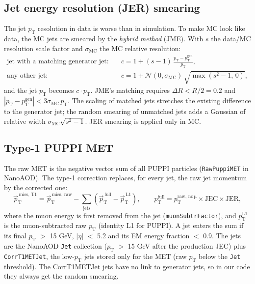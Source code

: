 \documentclass[11pt,a4paper]{article}
\newcommand{\pt}{$p_\mathrm{T}$}
\newcommand{\aeta}{$|\eta|$}
\begin{document}
\subsection{Jet energy resolution (JER) smearing}
The jet \pt{} resolution in data is worse than in simulation. To make MC look like data, the MC jets are smeared
by the \emph{hybrid method} (JME). With $s$ the data/MC resolution scale factor and $\sigma_\mathrm{MC}$ the MC relative resolution:
\begin{align}
\text{jet with a matching generator jet:}\quad & c = 1 + (s-1)\,\frac{p_\mathrm{T}-p_\mathrm{T}^\mathrm{gen}}{p_\mathrm{T}}, \\
\text{any other jet:}\quad & c = 1 + \mathcal{N}(0,\sigma_\mathrm{MC})\,\sqrt{\max(s^2-1,\,0)},
\end{align}
and the jet \pt{} becomes $c \cdot p_\mathrm{T}$. JME's matching requires $\Delta R < R/2 = 0.2$ and
$|p_\mathrm{T}-p_\mathrm{T}^\mathrm{gen}| < 3\sigma_\mathrm{MC}\,p_\mathrm{T}$. The scaling of matched jets stretches the
existing difference to the generator jet; the random smearing of unmatched jets adds a Gaussian of relative width
$\sigma_\mathrm{MC}\sqrt{s^2-1}$. JER smearing is applied only in MC.

\subsection{Type-1 PUPPI MET}
The raw MET is the negative vector sum of all PUPPI particles (\texttt{RawPuppiMET} in NanoAOD). The type-1 correction
replaces, for every jet, the raw jet momentum by the corrected one:
\begin{equation}
\vec{p}_\mathrm{T}^{\,\mathrm{miss,\,T1}} = \vec{p}_\mathrm{T}^{\,\mathrm{miss,\,raw}}
 - \sum_{\text{jets}} \left( \vec{p}_\mathrm{T}^{\,\mathrm{full}} - \vec{p}_\mathrm{T}^{\,\mathrm{L1}} \right),
\qquad p_\mathrm{T}^\mathrm{full} = p_\mathrm{T}^\mathrm{raw,\,no\,\mu}\times\mathrm{JEC}\times\mathrm{JER},
\end{equation}
where the muon energy is first removed from the jet (\texttt{muonSubtrFactor}), and $p_\mathrm{T}^\mathrm{L1}$ is the
muon-subtracted raw \pt{} (identity L1 for PUPPI). A jet enters the sum if its final \pt{} $>$ 15 GeV, \aeta{} $<$ 5.2
and its EM energy fraction $<$ 0.9. The jets are the NanoAOD \texttt{Jet} collection (\pt{} $>$ 15 GeV after the
production JEC) plus \texttt{CorrT1METJet}, the low-\pt{} jets stored only for the MET (raw \pt{} below the \texttt{Jet}
threshold). The CorrT1METJet jets have no link to generator jets, so in our code they always get the random smearing.
\end{document}
